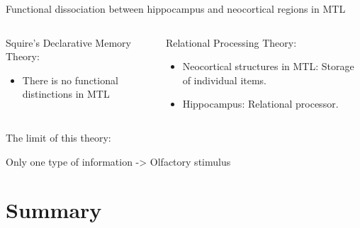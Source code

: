 \documentclass{beamer}
\begin{document}
\begin{frame}{Functional dissociation between hippocampus and neocortical regions in MTL}
		\begin{columns}
			
		\begin{column}{0.48\linewidth}
				\alert{Squire's Declarative Memory Theory:}
			\begin{itemize}
				\item
					There is no functional distinctions in MTL
				
			\end{itemize}
		\end{column}
		\hfill

		\begin{column}{0.48\linewidth}
		\alert{Relational Processing Theory:}
			\begin{itemize}
				\item
					Neocortical structures in MTL: Storage of individual items.
				\item
					Hippocampus: Relational processor.
				
			\end{itemize}
			
		\end{column}
		\end{columns}

		\vspace{1cm}
		The limit of this theory:

		Only one type of information -> Olfactory stimulus
\end{frame}

\section*{Summary}
\end{document}
